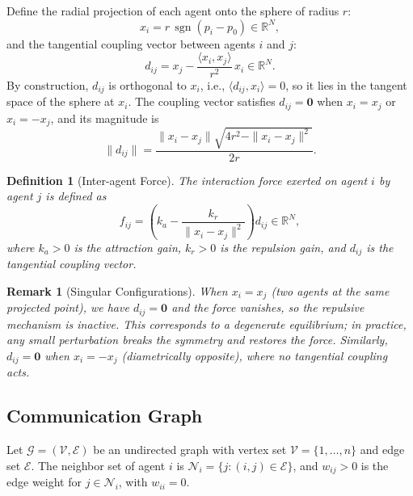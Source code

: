 \documentclass{ctexart}
\DeclareMathOperator{\sgn}{sgn}
\newtheorem{definition}[theorem]{Definition}
\newtheorem{remark}[theorem]{Remark}
\begin{document}
Define the radial projection of each agent onto the sphere of radius $r$:
\begin{equation}
    x_i = r\,\sgn(p_i - p_0) \in \mathbb{R}^N,
\end{equation}
and the tangential coupling vector between agents $i$ and $j$:
\begin{equation}
    d_{ij} = x_j - \frac{\langle x_i, x_j \rangle}{r^2}\, x_i \in \mathbb{R}^N.
\end{equation}
By construction, $d_{ij}$ is orthogonal to $x_i$, i.e., $\langle d_{ij}, x_i \rangle = 0$, so it lies in the tangent space of the sphere at $x_i$.
The coupling vector satisfies $d_{ij} = \mathbf{0}$ when $x_i = x_j$ or $x_i = -x_j$, and its magnitude is
\begin{equation}
\|d_{ij}\| = \frac{\|x_i - x_j\| \sqrt{4r^2 - \|x_i - x_j\|^2}}{2r}.
\end{equation}

\begin{definition}[Inter-agent Force]
The interaction force exerted on agent $i$ by agent $j$ is defined as
\begin{equation}
f_{ij} = \left(k_a - \frac{k_r}{\|x_i - x_j\|^2}\right) d_{ij} \in \mathbb{R}^N,
\end{equation}
where $k_a > 0$ is the attraction gain, $k_r > 0$ is the repulsion gain, and $d_{ij}$ is the tangential coupling vector.
\end{definition}

\begin{remark}[Singular Configurations]
When $x_i = x_j$ (two agents at the same projected point), we have $d_{ij} = \mathbf{0}$ and the force vanishes, so the repulsive mechanism is inactive.
This corresponds to a degenerate equilibrium; in practice, any small perturbation breaks the symmetry and restores the force.
Similarly, $d_{ij} = \mathbf{0}$ when $x_i = -x_j$ (diametrically opposite), where no tangential coupling acts.
\end{remark}

\subsection*{Communication Graph}

Let $\mathcal{G} = (\mathcal{V}, \mathcal{E})$ be an undirected graph with vertex set $\mathcal{V} = \{1,\dots,n\}$ and edge set $\mathcal{E}$.
The neighbor set of agent $i$ is $\mathcal{N}_i = \{j : (i,j) \in \mathcal{E}\}$, and $w_{ij} > 0$ is the edge weight for $j \in \mathcal{N}_i$, with $w_{ii} = 0$.
\end{document}
